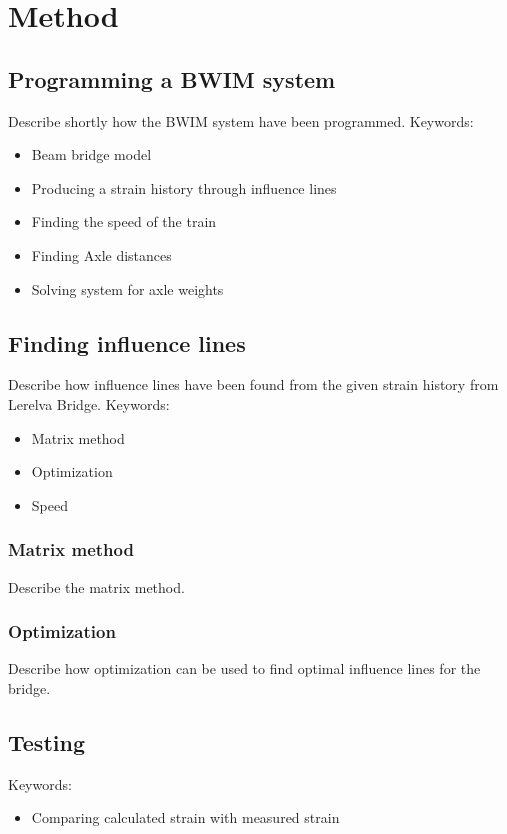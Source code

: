 \section{Method}

\subsection{Programming a BWIM system}
Describe shortly how the BWIM system have been programmed.
Keywords: 
\begin{itemize}
\item Beam bridge model
\item Producing a strain history through influence lines
\item Finding the speed of the train
\item Finding Axle distances
\item Solving system for axle weights
\end{itemize}
\subsection{Finding influence lines}
Describe how influence lines have been found from the given strain history from Lerelva Bridge. 
Keywords:
\begin{itemize}
\item Matrix method
\item Optimization
\item Speed
\end{itemize}
\subsubsection{Matrix method}
Describe the matrix method.

\subsubsection{Optimization}
Describe how optimization can be used to find optimal influence lines for the bridge.

\subsection{Testing}
Keywords:
\begin{itemize}
\item Comparing calculated strain with measured strain
\end{itemize}